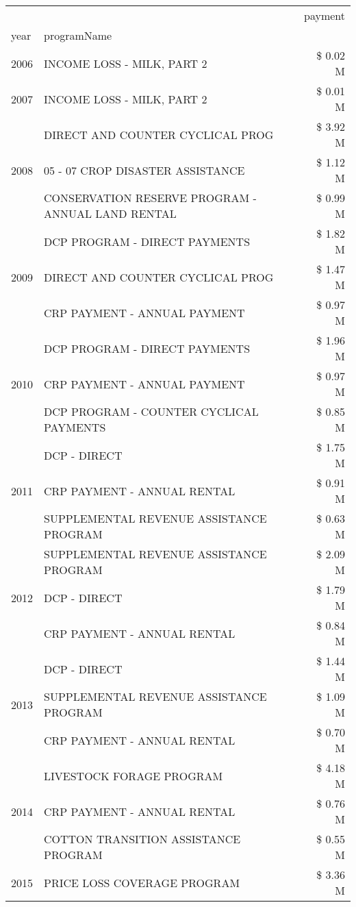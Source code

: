 \begin{tabular}{llr}
\toprule
 &  & payment \\
year & programName &  \\
\midrule
2006 & INCOME LOSS - MILK, PART 2 & \$ 0.02 M \\
\cline{1-3}
2007 & INCOME LOSS - MILK, PART 2 & \$ 0.01 M \\
\cline{1-3}
\multirow[t]{3}{*}{2008} & DIRECT AND COUNTER CYCLICAL PROG & \$ 3.92 M \\
 & 05 - 07 CROP DISASTER ASSISTANCE & \$ 1.12 M \\
 & CONSERVATION RESERVE PROGRAM - ANNUAL LAND RENTAL & \$ 0.99 M \\
\cline{1-3}
\multirow[t]{3}{*}{2009} & DCP PROGRAM - DIRECT PAYMENTS & \$ 1.82 M \\
 & DIRECT AND COUNTER CYCLICAL PROG & \$ 1.47 M \\
 & CRP PAYMENT - ANNUAL PAYMENT & \$ 0.97 M \\
\cline{1-3}
\multirow[t]{3}{*}{2010} & DCP PROGRAM - DIRECT PAYMENTS & \$ 1.96 M \\
 & CRP PAYMENT - ANNUAL PAYMENT & \$ 0.97 M \\
 & DCP PROGRAM - COUNTER CYCLICAL PAYMENTS & \$ 0.85 M \\
\cline{1-3}
\multirow[t]{3}{*}{2011} & DCP - DIRECT & \$ 1.75 M \\
 & CRP PAYMENT - ANNUAL RENTAL & \$ 0.91 M \\
 & SUPPLEMENTAL REVENUE ASSISTANCE PROGRAM & \$ 0.63 M \\
\cline{1-3}
\multirow[t]{3}{*}{2012} & SUPPLEMENTAL REVENUE ASSISTANCE PROGRAM & \$ 2.09 M \\
 & DCP - DIRECT & \$ 1.79 M \\
 & CRP PAYMENT - ANNUAL RENTAL & \$ 0.84 M \\
\cline{1-3}
\multirow[t]{3}{*}{2013} & DCP - DIRECT & \$ 1.44 M \\
 & SUPPLEMENTAL REVENUE ASSISTANCE PROGRAM & \$ 1.09 M \\
 & CRP PAYMENT - ANNUAL RENTAL & \$ 0.70 M \\
\cline{1-3}
\multirow[t]{3}{*}{2014} & LIVESTOCK FORAGE PROGRAM & \$ 4.18 M \\
 & CRP PAYMENT - ANNUAL RENTAL & \$ 0.76 M \\
 & COTTON TRANSITION ASSISTANCE PROGRAM & \$ 0.55 M \\
\cline{1-3}
\multirow[t]{3}{*}{2015} & PRICE LOSS COVERAGE PROGRAM & \$ 3.36 M \\

\end{tabular}
